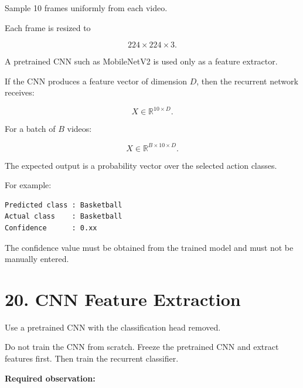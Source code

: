\documentclass[10pt]{article}
\begin{document}
Sample 10 frames uniformly from each video.

Each frame is resized to

\[
224\times224\times3.
\]

A pretrained CNN such as MobileNetV2 is used only as a feature extractor.

If the CNN produces a feature vector of dimension $D$, then the recurrent
network receives:

\[
X\in\mathbb{R}^{10\times D}.
\]

For a batch of $B$ videos:

\[
X\in\mathbb{R}^{B\times10\times D}.
\]

The expected output is a probability vector over the selected action classes.

For example:

\begin{verbatim}
Predicted class : Basketball
Actual class    : Basketball
Confidence      : 0.xx
\end{verbatim}

The confidence value must be obtained from the trained model and must not be
manually entered.

\section*{20. CNN Feature Extraction}

Use a pretrained CNN with the classification head removed.

\begin{center}
\end{center}

Do not train the CNN from scratch. Freeze the pretrained CNN and extract
features first. Then train the recurrent classifier.

\textbf{Required observation:}
\end{document}
